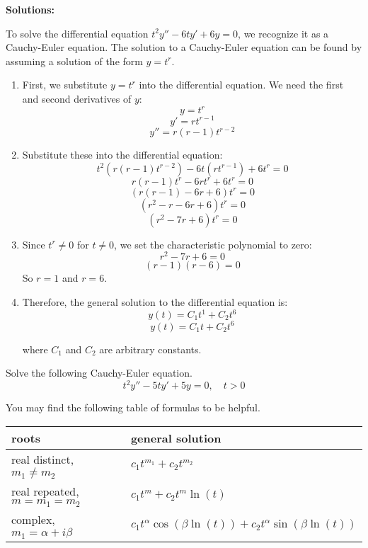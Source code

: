 \ifnum {} {\color{DarkBlue} 
\textbf{Solutions:}

To solve the differential equation \( t^2 y'' - 6t y' + 6y = 0 \), we recognize it as a Cauchy-Euler equation. The solution to a Cauchy-Euler equation can be found by assuming a solution of the form \( y = t^r \). 

\begin{enumerate}
    \item First, we substitute \( y = t^r \) into the differential equation. We need the first and second derivatives of \( y \):
   \[ y = t^r \]
   \[ y' = r t^{r-1} \]
   \[ y'' = r (r-1) t^{r-2} \]

    \item Substitute these into the differential equation:
   \[ t^2 (r (r-1) t^{r-2}) - 6t (r t^{r-1}) + 6 t^r = 0 \]
   \[ r (r-1) t^r - 6r t^r + 6 t^r = 0 \]
   \[ (r (r-1) - 6r + 6) t^r = 0 \]
   \[ (r^2 - r - 6r + 6) t^r = 0 \]
   \[ (r^2 - 7r + 6) t^r = 0 \]

    \item Since \( t^r \neq 0 \) for \( t \neq 0 \), we set the characteristic polynomial to zero:
   \[ r^2 - 7r + 6 = 0 \]
   \[ (r - 1)(r - 6) = 0 \]
   So \( r = 1 \) and \( r = 6 \).

    \item Therefore, the general solution to the differential equation is:
   \[ y(t) = C_1 t^1 + C_2 t^6 \]
   \[ y(t) = C_1 t + C_2 t^6 \]

where \( C_1 \) and \( C_2 \) are arbitrary constants.
\end{enumerate}


} 
\else 
\newpage
\fi
\fi 


\ifnum {}
\question[6] Solve the following Cauchy-Euler equation. 
$$t^2y'' - 5ty' + 5y = 0, \quad t > 0$$

You may find the following table of formulas to be helpful. 

\begin{center}
    \begin{tabular}{ p{6.2cm} p{6cm} }
        roots &  general solution 
        \\[2pt] \hline 
        real distinct, $m_1 \ne m_2$ &  $c_1 t^{m_1} + c_2 t^{m_2}$\\       
        real repeated, $m = m_1 = m_2$ & $c_1 t^{m} + c_2 t^m \ln(t)$\\
        complex, $m_1 = \alpha + i \beta$ & $c_1t^{\alpha}\cos(\beta \ln(t)) + c_2t^{\alpha}\sin(\beta \ln (t))$\\[2pt] \hline
    \end{tabular}    
\end{center}

